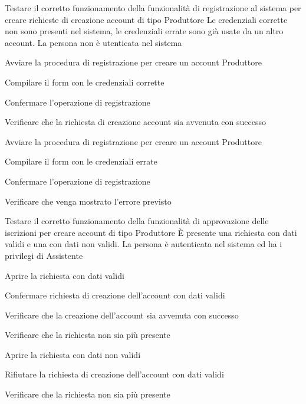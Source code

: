
{Testare il corretto funzionamento della funzionalità di registrazione al sistema per creare richieste di creazione account di tipo Produttore}
{Le credenziali corrette non sono presenti nel sistema, le credenziali errate sono già usate da un altro account. La persona non è utenticata nel sistema}
{\begin{enumCU}
    \item Avviare la procedura di registrazione per creare un account Produttore
    \item Compilare il form con le credenziali corrette
    \item Confermare l'operazione di registrazione
    \item Verificare che la richiesta di creazione account sia avvenuta con successo
    \item Avviare la procedura di registrazione per creare un account Produttore
    \item Compilare il form con le credenziali errate
    \item Confermare l'operazione di registrazione
    \item Verificare che venga mostrato l'errore previsto
\end{enumCU}}


{Testare il corretto funzionamento della funzionalità di approvazione delle iscrizioni per creare account di tipo Produttore}
{È presente una richiesta con dati validi e una con dati non validi. La persona è autenticata nel sistema ed ha i privilegi di Assistente}
{\begin{enumCU}
    \item Aprire la richiesta con dati validi
    \item Confermare richiesta di creazione dell'account con dati validi
    \item Verificare che la creazione dell'account sia avvenuta con successo
    \item Verificare che la richiesta non sia più presente
    \item Aprire la richiesta con dati non validi
    \item Rifiutare la richiesta di creazione dell'account con dati validi
    \item Verificare che la richiesta non sia più presente
\end{enumCU}}


